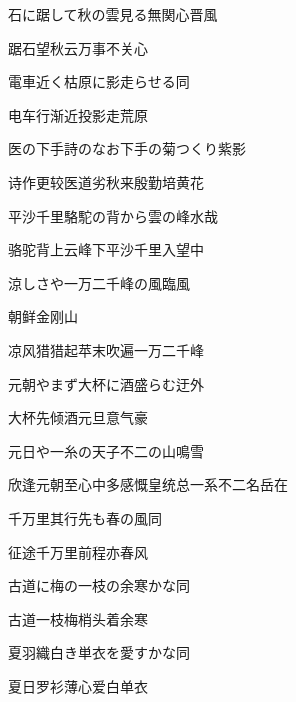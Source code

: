 \begin{haiku}
    {\FH 石に踞して秋の雲見る無関心}\hfill{\FH 晋風}

    {\FK 踞石望秋云万事不关心}
\end{haiku}

\begin{haiku}
    {\FH 電車近く枯原に影走らせる}\hfill{\FH 同}

    {\FK 电车行渐近投影走荒原}
\end{haiku}

\begin{haiku}
    {\FH 医の下手詩のなお下手の菊つくり}\hfill{\FH 紫影}

    {\FK 诗作更较医道劣秋来殷勤培黄花}
\end{haiku}

\begin{haiku}
    {\FH 平沙千里駱駝の背から雲の峰}\hfill{\FH 水哉}

    {\FK 骆驼背上云峰下平沙千里入望中}
\end{haiku}

\begin{haiku}
    {\FH 涼しさや一万二千峰の風}\hfill{\FH 臨風}

    {\FK 朝鲜金刚山}

    {\FK 凉风猎猎起苹末吹遍一万二千峰}
\end{haiku}

\begin{haiku}
    {\FH 元朝やまず大杯に酒盛らむ}\hfill{\FH 迂外}

    {\FK 大杯先倾酒元旦意气豪}
\end{haiku}

\begin{haiku}
    {\FH 元日や一糸の天子不二の山}\hfill{\FH 鳴雪}

    {\FK 欣逢元朝至心中多感慨皇统总一系不二名岳在}
\end{haiku}

\begin{haiku}
    {\FH 千万里其行先も春の風}\hfill{\FH 同}

    {\FK 征途千万里前程亦春风}
\end{haiku}

\begin{haiku}
    {\FH 古道に梅の一枝の余寒かな}\hfill{\FH 同}

    {\FK 古道一枝梅梢头着余寒}
\end{haiku}

\begin{haiku}
    {\FH 夏羽織白き単衣を愛すかな}\hfill{\FH 同}

    {\FK 夏日罗衫薄心爱白单衣}
\end{haiku}

